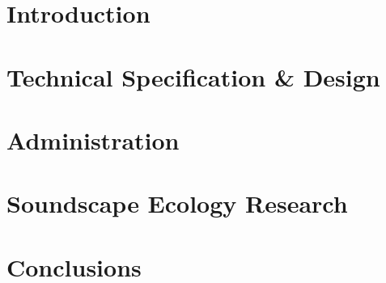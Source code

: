 \documentclass[12pt, twoside]{article}
\begin{document}
  
  \pagestyle{empty}                                     %
  \tableofcontents
  \newpage


  \pagestyle{plain} %
  \setcounter{page}{1}

  \section{Introduction}
  
  
  
  \newpage

  \section{Technical Specification \& Design}
  
  
  
  
  
  
  
  
  
  
  
  
  
  
  
  
  \newpage

  \section{Administration}
  
  
  
  \newpage

  \section{Soundscape Ecology Research}
  
  
  
  
  \newpage

  \section{Conclusions}
  
  
  
  \newpage

  \thispagestyle{empty}
  \printbibliography
\end{document}

